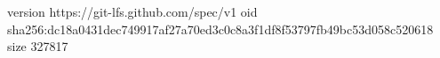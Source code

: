 version https://git-lfs.github.com/spec/v1
oid sha256:dc18a0431dec749917af27a70ed3c0c8a3f1df8f53797fb49bc53d058c520618
size 327817
